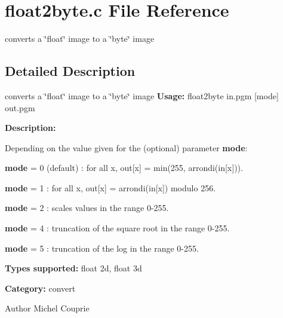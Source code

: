 \section{float2byte.c File Reference}
\label{float2byte_8c}


converts a \char`\"{}float\char`\"{} image to a \char`\"{}byte\char`\"{} image  




\subsection{Detailed Description}
converts a \char`\"{}float\char`\"{} image to a \char`\"{}byte\char`\"{} image {\bfseries Usage:} float2byte in.pgm [mode] out.pgm

{\bfseries Description:}

Depending on the value given for the (optional) parameter {\bfseries mode}: \begin{DoxyItemize}
\item {\bfseries mode} = 0 (default) : for all x, out[x] = min(255, arrondi(in[x])). \item {\bfseries mode} = 1 : for all x, out[x] = arrondi(in[x]) modulo 256. \item {\bfseries mode} = 2 : scales values in the range 0-\/255. \item {\bfseries mode} = 4 : truncation of the square root in the range 0-\/255. \item {\bfseries mode} = 5 : truncation of the log in the range 0-\/255.\end{DoxyItemize}
{\bfseries Types supported:} float 2d, float 3d

{\bfseries Category:} convert

\begin{DoxyAuthor}{Author}
Michel Couprie 
\end{DoxyAuthor}
